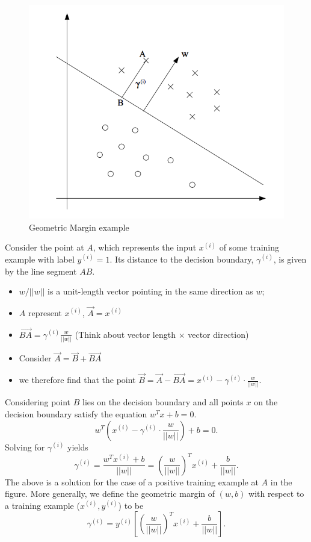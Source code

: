 \documentclass{article}  %
\begin{document}
\begin{figure}[htbp]
   \centering
   \includegraphics[scale=0.7]{geometric_margin.png} 
   \caption{Geometric Margin example}
   \label{fig:geometric_margin_example}
\end{figure}

Consider the point at $A$, which represents the input $x^{(i)}$ of some training example with label $y^{(i)} = 1$. Its distance to the decision boundary, $\gamma ^{(i)}$, is given by the line segment $AB$. 

\begin{itemize}
\item $w/||w||$ is a unit-length vector pointing in the same direction as $w$;
\item $A$ represent $x^{(i)}$, $\overrightarrow{A} = x^{(i)}$
\item $\overrightarrow{BA} = \gamma ^ {(i)} \frac{w}{||w||}$ (Think about vector length $\times$ vector direction)
\item Consider $\overrightarrow{A} = \overrightarrow{B} + \overrightarrow{BA}$
\item we therefore find that the point $\overrightarrow{B} = \overrightarrow{A} - \overrightarrow{BA} = x^{(i)} - \gamma^{(i)} \cdot \frac{w}{||w||}.$
\end{itemize}

Considering point $B$ lies on the decision boundary and all points $x$ on the decision boundary satisfy the equation $w^Tx+b = 0$. 
\[ w^T\left( x^{(i)} - \gamma^{(i)} \cdot \frac{w}{||w||}\right) + b= 0.
\]
Solving for $\gamma^{(i)}$ yields 
\[
\gamma^{(i)} = \frac{w^Tx^{(i)}+b}{||w||} = \left(\frac{w}{||w||}\right)^T x^{(i)} + \frac{b}{||w||}.
\]
The above is  a solution for the case of a positive training example at $A$ in the figure. More generally, we define the geometric margin of $(w,b)$ with respect to a training example ($x^{(i)}, y^{(i)}$) to be
\[
\gamma^{(i)} = y^{(i)} \left[\left(\frac{w}{||w||}\right)^T x^{(i)} + \frac{b}{||w||} \right].
\]
\end{document}

